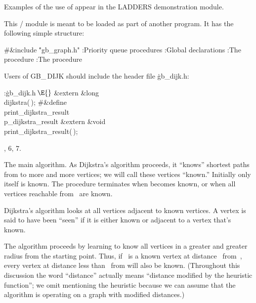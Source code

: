 Examples of the use of  appear in the {\sc LADDERS}
demonstration module.

\fi

This \CEE/ module is meant to be loaded as part of another program.
It has the following simple structure:

\Y\B\8\#\&{include} \.{"gb\_graph.h"}\6
\ATH\7
:Priority queue procedures\X\6
:Global declarations\X\6
:The  procedure\X\6
:The  procedure\X\par
\fi

Users of {\sc GB\_\,DIJK} should include the header file \.{gb\_dijk.h}:

\Y\B\4:\.{gb\_dijk.h\,}\X${}\E{}$\6
\&{extern} \&{long} \\{dijkstra}(\,);\6
\8\#\&{define} \\{print\_dijkstra\_result}\5\\{p\_dijkstra\_result}\6
\&{extern} \&{void} \\{print\_dijkstra\_result}(\,);\par
{}, 6, 7.\fi

The main algorithm.
As Dijkstra's algorithm proceeds, it ``knows'' shortest paths from 
to more and more vertices; we will call these vertices ``known.''
Initially only  itself is known. The procedure terminates when 
becomes known, or when all vertices reachable from~ are known.

Dijkstra's algorithm looks at all vertices adjacent to known vertices.
A vertex is said to have been ``seen'' if it is either known or
adjacent to a vertex that's known.

The algorithm proceeds by learning to know all vertices in a greater
and greater radius from the starting point. Thus, if ~is a known
vertex at distance~ from~, every vertex at distance less
than~ from
 will also be known.  (Throughout this discussion the word
``distance'' actually means ``distance modified by the heuristic
function''; we omit mentioning the heuristic because we can assume that
the algorithm is operating on a graph with modified distances.)

